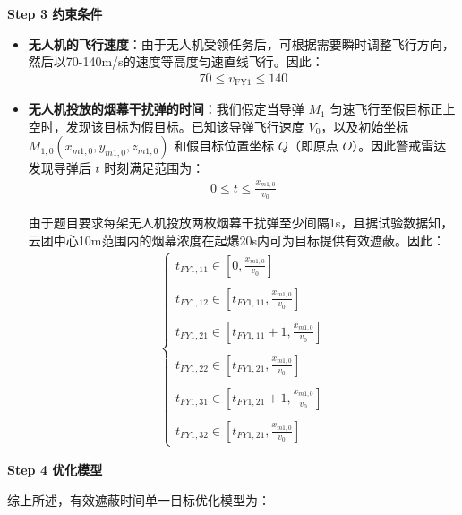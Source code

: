 \documentclass[../main.tex]{subfiles}
\begin{document}
\textbf{Step 3 约束条件}
\begin{itemize}
\item \textbf{无人机的飞行速度}：由于无人机受领任务后，可根据需要瞬时调整飞行方向，然后以70-140m/s的速度等高度匀速直线飞行。因此：
\begin{align}\label{11.8}
  70 \leq v_{\text{FY1}} \leq 140
\end{align}
\item \textbf{无人机投放的烟幕干扰弹的时间}：我们假定当导弹 \( M_1 \) 匀速飞行至假目标正上空时，发现该目标为假目标。已知该导弹飞行速度 \( V_0 \)，以及初始坐标 \( M_{1,0}(x_{m1,0}, y_{m1,0}, z_{m1,0}) \) 和假目标位置坐标 \( Q \)（即原点 \( O \)）。因此警戒雷达发现导弹后 \( t \) 时刻满足范围为：
\begin{align}
0 \leq t \leq \frac{x_{m1,0}}{v_0}
\end{align}
\par 由于题目要求每架无人机投放两枚烟幕干扰弹至少间隔1s，且据试验数据知，云团中心10m范围内的烟幕浓度在起爆20s内可为目标提供有效遮蔽。因此：
\begin{align}
\left\{ \begin{array}{l}
	t_{FY1,11}\in \left[ 0, \frac{x_{m1,0}}{v_0} \right]
	\\\\
	t_{FY1,12}\in \left[ t_{FY1,11}, \frac{x_{m1,0}}{v_0} \right]
	\\\\
	t_{FY1,21}\in \left[ t_{FY1,11}+1, \frac{x_{m1,0}}{v_0} \right]
	\\\\
	t_{FY1,22}\in \left[ t_{FY1,21}, \frac{x_{m1,0}}{v_0} \right]
	\\\\
	t_{FY1,31}\in \left[ t_{FY1,21}+1, \frac{x_{m1,0}}{v_0} \right]
	\\\\
	t_{FY1,32}\in \left[ t_{FY1,21}, \frac{x_{m1,0}}{v_0} \right]
\end{array} \right. 
\end{align}
\end{itemize}
\textbf{Step 4 优化模型}
\par 综上所述，有效遮蔽时间单一目标优化模型为：
\end{document}
